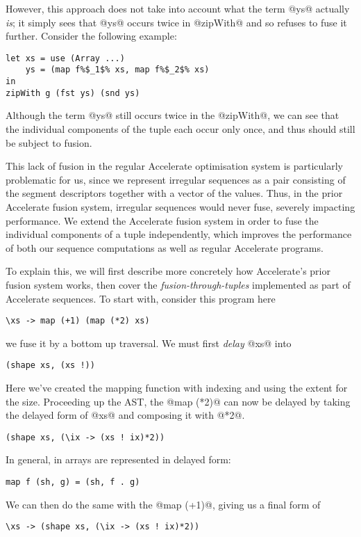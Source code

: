 However, this approach does not take into account what the term @ys@ actually
\emph{is}; it simply sees that @ys@ occurs twice in @zipWith@ and so refuses to
fuse it further. Consider the following example:
%
\begin{lstlisting}
let xs = use (Array ...)
    ys = (map f%$_1$% xs, map f%$_2$% xs)
in
zipWith g (fst ys) (snd ys)
\end{lstlisting}
%
Although the term @ys@ still occurs twice in the @zipWith@, we can see that the
individual components of the tuple each occur only once, and thus should still
be subject to fusion.

This lack of fusion in the regular Accelerate optimisation system is
particularly problematic for us, since we represent irregular sequences as a
pair consisting of the segment descriptors together with a vector of the values. Thus, in the prior Accelerate fusion system, irregular sequences would never fuse, severely impacting performance. We extend the Accelerate fusion system in order to fuse the individual components of a tuple independently, which improves the performance of both our sequence computations as well as regular Accelerate programs.

To explain this, we will first describe more concretely how Accelerate's prior fusion system works, then cover the \emph{fusion-through-tuples} implemented as part of Accelerate sequences. To start with, consider this program here
%
\begin{lstlisting}
\xs -> map (+1) (map (*2) xs)
\end{lstlisting}
%
we fuse it by a bottom up traversal. We must first \emph{delay} @xs@ into
%
\begin{lstlisting}
(shape xs, (xs !))
\end{lstlisting}
%
Here we've created the mapping function with indexing and using the extent for the size. Proceeding up the AST, the @map (*2)@ can now be delayed by taking the delayed form of @xs@ and composing it with @*2@.
%
\begin{lstlisting}
(shape xs, (\ix -> (xs ! ix)*2))
\end{lstlisting}
%
In general, in arrays are represented in delayed form:
%
\begin{lstlisting}
map f (sh, g) = (sh, f . g)
\end{lstlisting}
%
We can then do the same with the @map (+1)@, giving us a final form of
%
\begin{lstlisting}
\xs -> (shape xs, (\ix -> (xs ! ix)*2))
\end{lstlisting}

